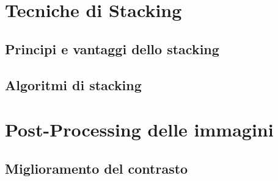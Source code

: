 \section{Tecniche di Stacking}

\subsection{Principi e vantaggi dello stacking}

\subsection{Algoritmi di stacking}

\section{Post-Processing delle immagini}

\subsection{Miglioramento del contrasto}

\cleardoublepage